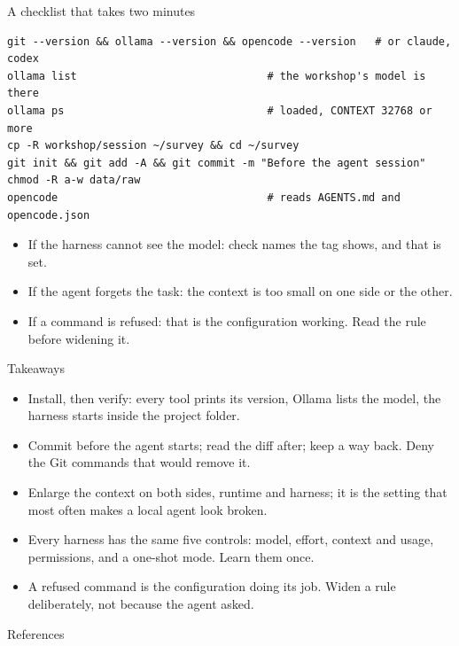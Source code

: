 \documentclass[11pt,aspectratio=169]{beamer}
\begin{document}
\begin{frame}[fragile]{A checklist that takes two minutes}
  \begin{lstlisting}[style=shell]
git --version && ollama --version && opencode --version   # or claude, codex
ollama list                              # the workshop's model is there
ollama ps                                # loaded, CONTEXT 32768 or more
cp -R workshop/session ~/survey && cd ~/survey
git init && git add -A && git commit -m "Before the agent session"
chmod -R a-w data/raw
opencode                                 # reads AGENTS.md and opencode.json
  \end{lstlisting}
  \begin{itemize}
    \item If the harness cannot see the model: check 
      names the tag  shows, and that  is
      set.
    \item If the agent forgets the task: the context is too small on one side
      or the other.
    \item If a command is refused: that is the configuration working. Read
      the rule before widening it.
  \end{itemize}
\end{frame}

\begin{frame}{Takeaways}
  \begin{itemize}
    \item Install, then verify: every tool prints its version, Ollama lists
      the model, the harness starts inside the project folder.
    \item Commit before the agent starts; read the diff after; keep a way
      back. Deny the Git commands that would remove it.
    \item Enlarge the context on both sides, runtime and harness; it is the
      setting that most often makes a local agent look broken.
    \item Every harness has the same five controls: model, effort, context
      and usage, permissions, and a one-shot mode. Learn them once.
    \item A refused command is the configuration doing its job. Widen a rule
      deliberately, not because the agent asked.
  \end{itemize}
\end{frame}

\begin{frame}[allowframebreaks]{References}
  \printbibliography[heading=none]
\end{frame}
\end{document}
